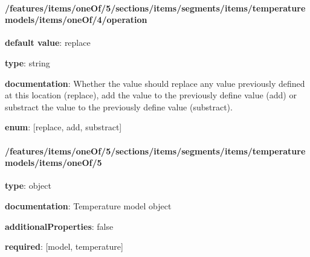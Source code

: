 \begin{itemized}
\end{itemized}\paragraph{/features/items/oneOf/5/sections/items/segments/items/temperature models/items/oneOf/4/operation} \begin{itemized}
\item {\bf default value}: replace
\item {\bf type}: string
\item {\bf documentation}: Whether the value should replace any value previously defined at this location (replace), add the value to the previously define value (add) or substract the value to the previously define value (substract).
\item {\bf enum}: [replace, add, substract]\end{itemized}\paragraph{/features/items/oneOf/5/sections/items/segments/items/temperature models/items/oneOf/5} \begin{itemized}
\item {\bf type}: object
\item {\bf documentation}: Temperature model object
\item {\bf additionalProperties}: false
\item {\bf required}: [model, temperature]\end{itemized}
